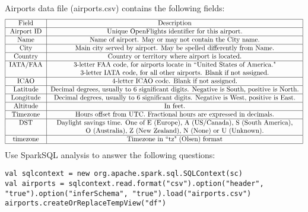 \documentclass[11pt]{article}
\newcommand{\ques}[1]{\noindent {\bf Question #1: }}
\begin{document}
\ques{4} Airports data file (airports.csv) contains the following fields: 
$$ \begin{tabular}{|c|c|} \hline 
Field & Description \\ \hline 
Airport ID & Unique OpenFlights identifier for this airport. \\ \hline 
Name & Name of airport. May or may not contain the City name. \\ \hline 
City & Main city served by airport. May be spelled differently from Name. \\ \hline 
Country & Country or territory where airport is located. \\ \hline
IATA/FAA & 3-letter FAA code, for airports locate in ``United States of America." \\ 
& 3-letter IATA code, for all other airports. Blank if not assigned. \\ \hline 
ICAO & 4-letter ICAO code. Blank if not assigned. \\ \hline 
Latitude & Decimal degrees, usually to 6 significant digits. Negative is South, positive is North. \\ \hline 
Longitude & Decimal degrees, usually to 6 significant digits. Negative is West, positive is East. \\ \hline
Altitude & In feet. \\ \hline 
Timezone & Hours offset from UTC. Fractional hours are expressed in decimals. \\ \hline 
DST & Daylight savings time. One of E (Europe), A (US/Canada), S (South America), \\ 
& O (Australia), Z (New Zealand), N (None) or U (Unknown). \\ \hline 
timezone & Timezone in ``tz" (Olsen) format \\ \hline \end{tabular} $$ 
\newpage
Use SparkSQL analysis to answer the following questions: 
\begin{lstlisting}
val sqlcontext = new org.apache.spark.sql.SQLContext(sc)
val airports = sqlcontext.read.format("csv").option("header", "true").option("inferSchema", "true").load("airports.csv")
airports.createOrReplaceTempView("df")
\end{lstlisting}
\end{document}
